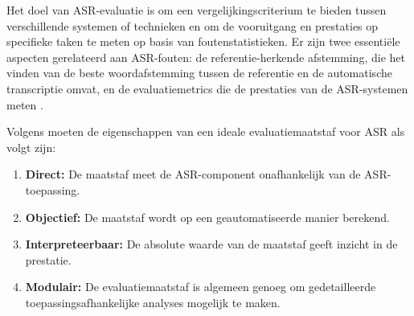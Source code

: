 Het doel van ASR-evaluatie is om een vergelijkingscriterium te bieden tussen verschillende systemen of technieken en om de vooruitgang en prestaties op specifieke taken te meten op basis van foutenstatistieken. Er zijn twee essentiële aspecten gerelateerd aan ASR-fouten: de referentie-herkende afstemming, die het vinden van de beste woordafstemming tussen de referentie en de automatische transcriptie omvat, en de evaluatiemetrics die de prestaties van de ASR-systemen meten \autocite{McCowan2004}.


Volgens \textcite{McCowan2004} moeten de eigenschappen van een ideale evaluatiemaatstaf voor ASR als volgt zijn:
\begin{enumerate}[label=\arabic*.]
 \item \textbf{Direct:} De maatstaf meet de ASR-component onafhankelijk van de ASR-toepassing.
 
 \item \textbf{Objectief:} De maatstaf wordt op een geautomatiseerde manier berekend.
 
 \item \textbf{Interpreteerbaar:} De absolute waarde van de maatstaf geeft inzicht in de prestatie.
 
 \item \textbf{Modulair:} De evaluatiemaatstaf is algemeen genoeg om gedetailleerde toepassingsafhankelijke analyses mogelijk te maken.
\end{enumerate} 

